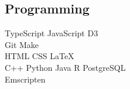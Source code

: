 \documentclass[]{mershon-two-column-resume}
\begin{document}
\begin{minipage}[t]{0.33\textwidth}
		\sectionsep
					
		\subsection{Programming}
		TypeScript \textbullet{} JavaScript \textbullet{} D3 \\
		Git \textbullet{} Make \\
		HTML \textbullet{} CSS \textbullet{} \LaTeX \\
		C++ \textbullet{} Python \textbullet{} Java \textbullet{} R \textbullet{} PostgreSQL \\
		Emscripten
		
		\sectionsep
				
		
	\end{minipage} 
	\hfill
\end{document}
